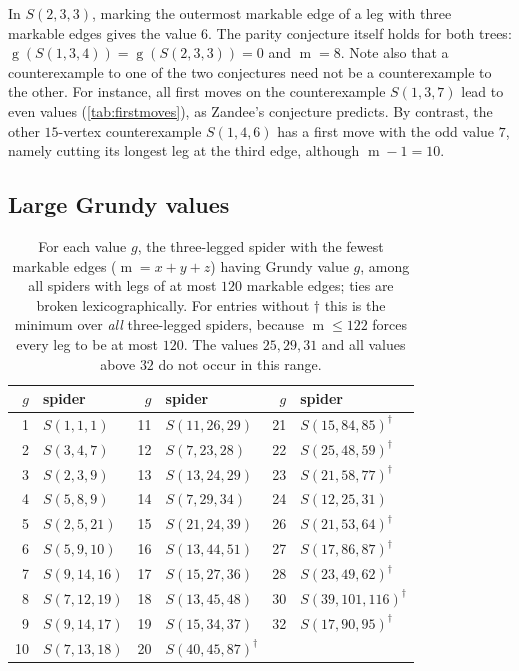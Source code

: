\documentclass[11pt]{amsart}
\theoremstyle{definition}
\theoremstyle{remark}
\newcommand{\gv}{\operatorname{g}}           %
\newcommand{\m}{\operatorname{m}}
\newcommand{\Sp}{S}
\begin{document}
In $\Sp(2,3,3)$, marking the outermost markable edge of a leg with three markable edges gives the value $6$. The parity conjecture itself holds for both trees: $\gv(\Sp(1,3,4))=\gv(\Sp(2,3,3))=0$ and $\m=8$. Note also that a counterexample to one of the two conjectures need not be a counterexample to the other. For instance, all first moves on the counterexample $\Sp(1,3,7)$ lead to even values (\cref{tab:firstmoves}), as Zandee's conjecture predicts. By contrast, the other $15$-vertex counterexample $\Sp(1,4,6)$ has a first move with the odd value $7$, namely cutting its longest leg at the third edge, although $\m-1=10$.

\subsection{Large Grundy values}

\begin{table}[t]
\centering
\small
\begin{tabular}{rl@{\qquad}rl@{\qquad}rl}
\toprule
$g$ & spider & $g$ & spider & $g$ & spider\\
\midrule
1 & $\Sp(1,1,1)$ & 11 & $\Sp(11,26,29)$ & 21 & $\Sp(15,84,85)^{\dagger}$\\
2 & $\Sp(3,4,7)$ & 12 & $\Sp(7,23,28)$ & 22 & $\Sp(25,48,59)^{\dagger}$\\
3 & $\Sp(2,3,9)$ & 13 & $\Sp(13,24,29)$ & 23 & $\Sp(21,58,77)^{\dagger}$\\
4 & $\Sp(5,8,9)$ & 14 & $\Sp(7,29,34)$ & 24 & $\Sp(12,25,31)$\\
5 & $\Sp(2,5,21)$ & 15 & $\Sp(21,24,39)$ & 26 & $\Sp(21,53,64)^{\dagger}$\\
6 & $\Sp(5,9,10)$ & 16 & $\Sp(13,44,51)$ & 27 & $\Sp(17,86,87)^{\dagger}$\\
7 & $\Sp(9,14,16)$ & 17 & $\Sp(15,27,36)$ & 28 & $\Sp(23,49,62)^{\dagger}$\\
8 & $\Sp(7,12,19)$ & 18 & $\Sp(13,45,48)$ & 30 & $\Sp(39,101,116)^{\dagger}$\\
9 & $\Sp(9,14,17)$ & 19 & $\Sp(15,34,37)$ & 32 & $\Sp(17,90,95)^{\dagger}$\\
10 & $\Sp(7,13,18)$ & 20 & $\Sp(40,45,87)^{\dagger}$ & & \\
\bottomrule
\end{tabular}
\caption{For each value $g$, the three-legged spider with the fewest markable edges ($\m=x+y+z$) having Grundy value $g$, among all spiders with legs of at most $120$ markable edges; ties are broken lexicographically. For entries without $\dagger$ this is the minimum over \emph{all} three-legged spiders, because $\m\le 122$ forces every leg to be at most $120$. The values $25,29,31$ and all values above $32$ do not occur in this range.}
\label{tab:spidervalues}
\end{table}
\end{document}
